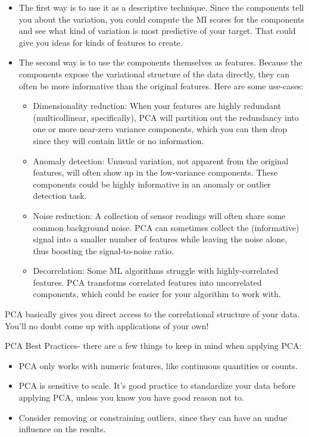 \documentclass[12pt]{report}
\begin{document}
\begin{itemize}
  \item The first way is to use it as a descriptive technique. Since the components tell you about the variation, you could compute the MI scores for the components and see what kind of variation is most predictive of your target. That could give you ideas for kinds of features to create.
  \item The second way is to use the components themselves as features. Because the components expose the variational structure of the data directly, they can often be more informative than the original features. Here are some use-cases:
  \begin{itemize}
    \item Dimensionality reduction: When your features are highly redundant (multicollinear, specifically), PCA will partition out the redundancy into one or more near-zero variance components, which you can then drop since they will contain little or no information.
    \item Anomaly detection: Unusual variation, not apparent from the original features, will often show up in the low-variance components. These components could be highly informative in an anomaly or outlier detection task.
    \item Noise reduction: A collection of sensor readings will often share some common background noise. PCA can sometimes collect the (informative) signal into a smaller number of features while leaving the noise alone, thus boosting the signal-to-noise ratio.
    \item Decorrelation: Some ML algorithms struggle with highly-correlated features. PCA transforms correlated features into uncorrelated components, which could be easier for your algorithm to work with.
  \end{itemize}
\end{itemize}

PCA basically gives you direct access to the correlational structure of your data. You'll no doubt come up with applications of your own!

PCA Best Practices- there are a few things to keep in mind when applying PCA:
\begin{itemize}
\item PCA only works with numeric features, like continuous quantities or counts.
\item PCA is sensitive to scale. It's good practice to standardize your data before applying PCA, unless you know you have good reason not to.
\item Consider removing or constraining outliers, since they can have an undue influence on the results.
\end{itemize}
\end{document}
